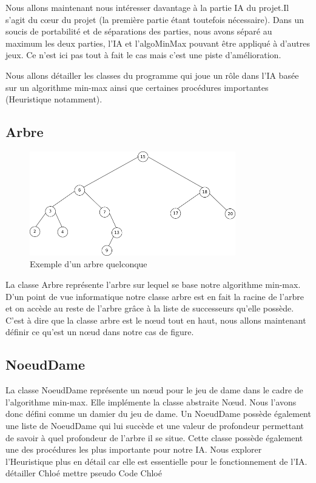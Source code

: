 \documentclass[12,french]{report}
\begin{document}
Nous allons maintenant nous intéresser davantage à la partie IA du projet.Il s'agit du cœur du projet (la première partie étant toutefois nécessaire). Dans un soucis de portabilité et de séparations des parties, nous avons séparé au maximum les deux parties, l'IA et l'algoMinMax pouvant être appliqué à d'autres jeux. Ce n'est ici pas tout à fait le cas mais c'est une piste d'amélioration.

 Nous allons détailler les classes du programme qui joue un rôle dans l'IA basée sur un algorithme min-max ainsi que certaines procédures importantes (Heuristique notamment).

\subsection{Arbre}

\begin{figure}[H]
	\center
	\includegraphics[width=0.8\textwidth]{./Images/arbre}
	\caption{Exemple d'un arbre quelconque}
\end{figure}\vspace{0.2cm}

La classe Arbre représente l'arbre sur lequel se base notre algorithme min-max. D'un point de vue informatique notre classe arbre est en fait la racine de l'arbre et on accède au reste de l'arbre grâce à la liste de successeurs qu'elle possède. C'est à dire que la classe arbre est le nœud tout en haut, nous allons maintenant définir ce qu'est un nœud dans notre cas de figure.

\subsection{NoeudDame}

La classe NoeudDame représente un nœud pour le jeu de dame dans le cadre de l'algorithme min-max. Elle implémente la classe abstraite Nœud. Nous l'avons donc défini comme un damier du jeu de dame. Un NoeudDame possède également une liste de NoeudDame qui lui succède et une valeur de profondeur permettant de savoir à quel profondeur de l'arbre il se situe. Cette classe possède également une des procédures les plus importante pour notre IA. Nous explorer l'Heuristique plus en détail car elle est essentielle pour le fonctionnement de l'IA.
détailler Chloé
mettre pseudo Code Chloé
\end{document}
